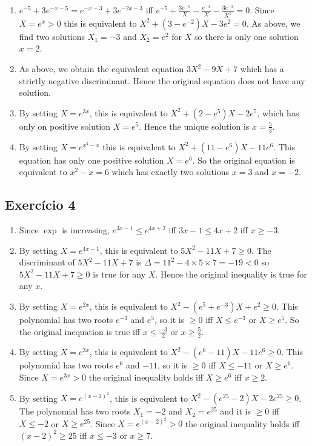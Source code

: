 \begin{enumerate}
\item $e^{-5} + 3e^{-x-5} = e^{-x-3} + 3e^{-2x-3}$ iff
  $e^{-5} + \frac{3e^{-5}}{X} - \frac{e^{-3}}{X} - \frac{3e^{-3}}{X^2} = 0$.
  Since $X = e^x > 0$ this is equivalent to
  $X^2 + {(3 - e^{-2})}X - 3e^2 = 0$.
  As above, we find two solutions $X_1 = -3$ and $X_2 = e^2$ for $X$ so there is
  only one solution $x = 2$.
\item
  As above, we obtain the equivalent equation
  $3X^2 -9X + 7$ which has a strictly negative
  discriminant. Hence the original equation does not have any solution.

\item By setting $X = e^{3x}$,
  this is equivalent to
  $X^2 + (2-e^5)X - 2e^5$, which has only on positive solution $X = e^5$.
  Hence the unique solution is $x = \frac{5}{3}$.

\item By setting $X = e^{x^2-x}$ this is equivalent to
  $X^2 + {(11 - e^6)}X - 11e^6$. This equation has only one positive solution
  $X = e^6$. So the original equation is equivalent to $x^2 - x = 6$
  which has exactly two solutions $x = 3$ and $x = -2$.

\end{enumerate}

\subsection*{Exercício 4}

\begin{enumerate}
\item Since $\exp$ is increasing, $e^{3x-1} \leq e^{4x+2}$ iff
  $3x - 1 \leq 4x +2$ iff $x \geq -3$.
\item By setting $X = e^{4x-1}$, this is equivalent to
  $5X^2 -11X + 7 \geq 0$. The discriminant of $5X^2 -11X + 7$ is
  $\Delta = 11^2 - 4 \times 5 \times 7 = -19 < 0$ so
  $5X^2 -11X + 7 \geq 0$ is true for any $X$. Hence the original inequality
  is true for any $x$.
\item By setting $X = e^{2x}$, this is equivalent to
  $X^2 -{(e^5 +e^{-3})} X + e^2 \geq 0$. This polynomial has two roots
  $e^{-3}$ and $e^5$, so it is $\geq 0$ iff $X \leq e^{-3}$ or $X \geq e^{5}$.
  So the original inequation is true iff $x \leq \frac{-3}{2}$ or
  $x \geq \frac{5}{2}$.
\item By setting $X = e^{3x}$, this is equivalent to
  $X^2 - {(e^6-11)}X - 11e^6 \geq 0$.
  This polynomial has two roots
  $e^{6}$ and $-11$, so it is $\geq 0$ iff
  $X \leq -11$ or $X \geq e^{6}$. Since $X = e^{3x} > 0$ the original
  inequality holds iff $X \geq e^{6}$ iff $x \geq 2$.
\item By setting $X = e^{{(x-2)}^2}$,
  this is equivalent to
  $X^2 - {(e^{25} - 2)} X - 2e^{25} \geq 0$. The polynomial has two roots
  $X_1 = -2$ and $X_2=e^{25}$ and it is $\geq 0$ iff
  $X \leq -2$ or $X \geq e^{25}$. Since $X = e^{{(x-2)}^2} > 0$
  the original inequality holds iff $(x-2)^2 \geq 25$ iff
  $x \leq -3$ or $x \geq 7$.

\end{enumerate}

